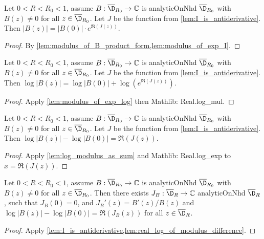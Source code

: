 \begin{lemma}\label{lem:modulus_of_exp_log}
\leanok
{}
Let $0<R<R_0<1$, assume $B:\overline{\D}_{R_0}\to\mathbb{C}$ is analyticOnNhd $\overline{\D}_{R_0}$ with $B(z) \ne 0$ for all $z \in \overline{\D}_{R_0}$. Let $J$ be the function from \cref{lem:I_is_antiderivative}. Then $|B(z)| = |B(0)| \cdot e^{\Re(J(z))}$.
\end{lemma}
\begin{proof}
\leanok
By \cref{lem:modulus_of_B_product_form,lem:modulus_of_exp_I}.
\end{proof}


\begin{lemma}\label{lem:log_modulus_as_sum}
\leanok
{}
Let $0<R<R_0<1$, assume $B:\overline{\D}_{R_0}\to\mathbb{C}$ is analyticOnNhd $\overline{\D}_{R_0}$ with $B(z) \ne 0$ for all $z \in \overline{\D}_{R_0}$. Let $J$ be the function from \cref{lem:I_is_antiderivative}. Then $\log|B(z)| = \log|B(0)| + \log(e^{\Re(J(z))})$.
\end{lemma}
\begin{proof}
\leanok
Apply \cref{lem:modulus_of_exp_log} then Mathlib: Real.log\_mul.
\end{proof}

\begin{lemma}\label{lem:real_log_of_modulus_difference}
\leanok
{}
Let $0<R<R_0<1$, assume $B:\overline{\D}_{R_0}\to\mathbb{C}$ is analyticOnNhd $\overline{\D}_{R_0}$ with $B(z) \ne 0$ for all $z \in \overline{\D}_{R_0}$. Let $J$ be the function from \cref{lem:I_is_antiderivative}. Then $\log|B(z)| - \log|B(0)| = \Re(J(z))$.
\end{lemma}
\begin{proof}
\leanok
Apply \cref{lem:log_modulus_as_sum} and Mathlib: Real.log\_exp to $x=\Re(J(z))$.
\end{proof}

\begin{lemma}\label{lem:log_of_analytic}
\leanok
{}
Let $0<R<R_0<1$, assume $B:\overline{\D}_{R_0}\to\mathbb{C}$ is analyticOnNhd $\overline{\D}_{R_0}$ with $B(z) \ne 0$ for all $z \in \overline{\D}_{R_0}$. Then there exists $J_B: \overline{\D}_R\to\mathbb{C}$ analyticOnNhd $\overline{\D}_{R}$, such that $J_B(0)=0$, and $J_B'(z) = B'(z)/B(z)$ and $\log|B(z)| - \log|B(0)| = \Re(J_B(z))$ for all $z \in \overline{\D}_R$.
\end{lemma}
\begin{proof}
\leanok
Apply \cref{lem:I_is_antiderivative,lem:real_log_of_modulus_difference}.
\end{proof}
